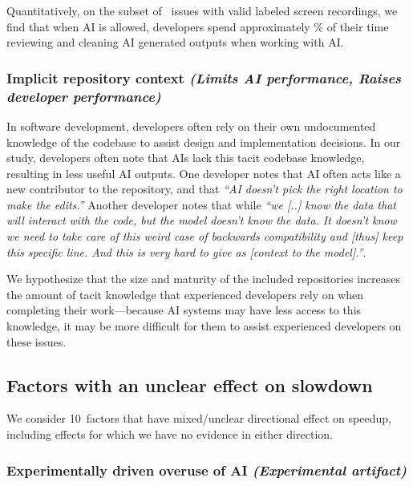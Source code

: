 \documentclass{article}
\newcommand{\devquote}[1]{\textcolor{quotecolor}{\textit{``#1''}}}
\newcommand{\NumFactorsThatAreUnclear}{10}
\begin{document}
Quantitatively, on the subset of \NumLoomVideosFilteredAIAllowed\ issues with valid labeled screen recordings, we find that when AI is allowed, developers spend approximately \PctReviewingAIOutputAIAllowed\% of their time reviewing and cleaning AI generated outputs when working with AI.


\subsubsection{Implicit repository context \textnormal{\textit{(Limits AI performance, Raises developer performance)}}}
\label{sec:factor-implicit-repository-context}

In software development, developers often rely on their own undocumented knowledge of the codebase to assist design and implementation decisions. In our study, developers often note that AIs lack this tacit codebase knowledge, resulting in less useful AI outputs. One developer notes that AI often acts like a new contributor to the repository, and that \devquote{AI doesn’t pick the right location to make the edits.} 
Another developer notes that while \devquote{we [..] know the data that will interact with the code, but the model doesn't know the data. It doesn't know we need to take care of this weird case of backwards compatibility and [thus] keep this specific line. And this is very hard to give as [context to the model].}.

We hypothesize that the size and maturity of the included repositories increases the amount of tacit knowledge that experienced developers rely on when completing their work---because AI systems may have less access to this knowledge, it may be more difficult for them to assist experienced developers on these issues.





\subsection{Factors with an unclear effect on slowdown}
\label{sec:factorsuncleardriving}

We consider \NumFactorsThatAreUnclear\ factors that have mixed/unclear directional effect on speedup, including effects for which we have no evidence in either direction.


\subsubsection{Experimentally driven overuse of AI \textnormal{\textit{(Experimental artifact)}}}
\label{sec:factor-overuse-of-ai}
\end{document}

